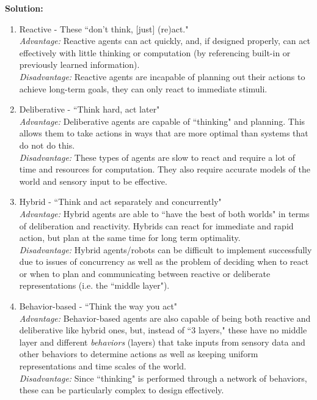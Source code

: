 \documentclass{article}
\begin{document}
\begin{enumerate}
\textbf{Solution:}
    \begin{enumerate}
    \item Reactive - These ``don't think, [just] (re)act." \\
    \textit{Advantage:} Reactive agents can act quickly, and, if designed 
                        properly, can act effectively with little thinking or computation (by referencing built-in or previously learned information). \\
    \textit{Disadvantage:} Reactive agents are incapable of planning out their
                           actions to achieve long-term goals, they can only react to immediate stimuli. \\

    \item Deliberative - ``Think hard, act later" \\
    \textit{Advantage:} Deliberative agents are capable of ``thinking" and
                        planning. This allows them to take actions in ways that are more optimal than systems that do not do this.
                        \\
    \textit{Disadvantage:} These types of agents are slow to react and require
                           a lot of time and resources for computation. They also require accurate models of the world and sensory input to be effective. \\

    \item Hybrid - ``Think and act separately and concurrently" \\
    \textit{Advantage:} Hybrid agents are able to ``have the best of both
                        worlds" in terms of deliberation and reactivity. Hybrids can react for immediate and rapid action, but plan at the same time for long term optimality. \\
    \textit{Disadvantage:} Hybrid agents/robots can be difficult to implement
                        successfully due to issues of concurrency as well as the problem of deciding when to react or when to plan and communicating between reactive or deliberate representations (i.e. the ``middle layer"). \\

    \item Behavior-based - ``Think the way you act" \\
    \textit{Advantage:} Behavior-based agents are also capable of being both
                        reactive and deliberative like hybrid ones, but, instead of ``3 layers," these have no middle layer and different \textit{behaviors} (layers) that take inputs from sensory data and other behaviors to determine actions as well as keeping uniform representations and time scales of the world. \\
    \textit{Disadvantage:} Since ``thinking" is performed through a network
                           of behaviors, these can be particularly complex to design effectively. \\


\end{enumerate}
\end{enumerate}
\end{document}

